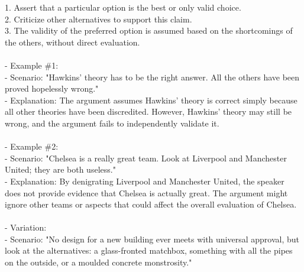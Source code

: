 \documentclass[a4paper,12pt,single,pdftex]{scrartcl}
\begin{document}
    
        1. Assert that a particular option is the best or only valid choice.
    \\

    
        2. Criticize other alternatives to support this claim.
    \\

    
        3. The validity of the preferred option is assumed based on the shortcomings of the others, without direct evaluation.
    \\

    
      
    \\

    
      - Example \#1:
    \\

    
        - Scenario: "Hawkins’ theory has to be the right answer. All the others have been proved hopelessly wrong."
    \\

    
        - Explanation: The argument assumes Hawkins' theory is correct simply because all other theories have been discredited. However, Hawkins’ theory may still be wrong, and the argument fails to independently validate it.
    \\

    
      
    \\

    
      - Example \#2:
    \\

    
        - Scenario: "Chelsea is a really great team. Look at Liverpool and Manchester United; they are both useless."
    \\

    
        - Explanation: By denigrating Liverpool and Manchester United, the speaker does not provide evidence that Chelsea is actually great. The argument might ignore other teams or aspects that could affect the overall evaluation of Chelsea.
    \\

    
      
    \\

    
      - Variation:
    \\

    
        - Scenario: "No design for a new building ever meets with universal approval, but look at the alternatives: a glass-fronted matchbox, something with all the pipes on the outside, or a moulded concrete monstrosity."
    \\
\end{document}
